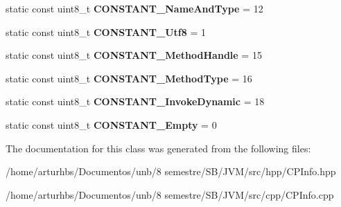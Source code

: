 \begin{DoxyCompactItemize}
\item 
static const uint8\+\_\+t {\bfseries C\+O\+N\+S\+T\+A\+N\+T\+\_\+\+Name\+And\+Type} = 12\hypertarget{classCPInfo_af2407f4efc21cd1b7d92242a128804c7}{}\label{classCPInfo_af2407f4efc21cd1b7d92242a128804c7}

\item 
static const uint8\+\_\+t {\bfseries C\+O\+N\+S\+T\+A\+N\+T\+\_\+\+Utf8} = 1\hypertarget{classCPInfo_a716493735ca550f026bd00af6b709425}{}\label{classCPInfo_a716493735ca550f026bd00af6b709425}

\item 
static const uint8\+\_\+t {\bfseries C\+O\+N\+S\+T\+A\+N\+T\+\_\+\+Method\+Handle} = 15\hypertarget{classCPInfo_aa57a93a2e444d75369af492bf0885c96}{}\label{classCPInfo_aa57a93a2e444d75369af492bf0885c96}

\item 
static const uint8\+\_\+t {\bfseries C\+O\+N\+S\+T\+A\+N\+T\+\_\+\+Method\+Type} = 16\hypertarget{classCPInfo_af366bc74160698ae239cf9c8dbdd4df1}{}\label{classCPInfo_af366bc74160698ae239cf9c8dbdd4df1}

\item 
static const uint8\+\_\+t {\bfseries C\+O\+N\+S\+T\+A\+N\+T\+\_\+\+Invoke\+Dynamic} = 18\hypertarget{classCPInfo_a7930e6f14535f70bbc74fa557156e423}{}\label{classCPInfo_a7930e6f14535f70bbc74fa557156e423}

\item 
static const uint8\+\_\+t {\bfseries C\+O\+N\+S\+T\+A\+N\+T\+\_\+\+Empty} = 0\hypertarget{classCPInfo_a5a40f7d553974f74c028484d0fafde0c}{}\label{classCPInfo_a5a40f7d553974f74c028484d0fafde0c}

\end{DoxyCompactItemize}


The documentation for this class was generated from the following files\+:\begin{DoxyCompactItemize}
\item 
/home/arturhbs/\+Documentos/unb/8 semestre/\+S\+B/\+J\+V\+M/src/hpp/C\+P\+Info.\+hpp\item 
/home/arturhbs/\+Documentos/unb/8 semestre/\+S\+B/\+J\+V\+M/src/cpp/C\+P\+Info.\+cpp\end{DoxyCompactItemize}
